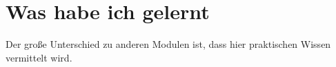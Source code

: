 \chapter{Was habe ich gelernt}

Der große Unterschied zu anderen Modulen ist, dass hier praktischen Wissen vermittelt wird. 